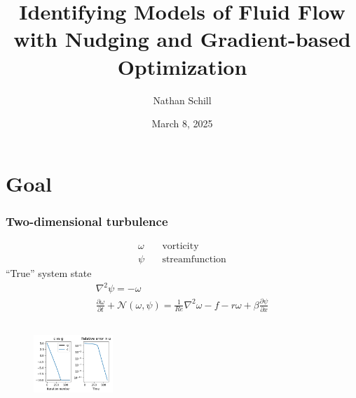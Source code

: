 \documentclass{beamer}
\title{Identifying Models of Fluid Flow with Nudging and Gradient-based Optimization}
\author{Nathan Schill}
\institute{Brigham Young University}
\date{March 8, 2025}
\begin{document}
\frame{\titlepage}

\section{Goal}

\begin{frame}
  \frametitle{Two-dimensional turbulence \cite{guan_online_2024}}

  \begin{align*}
    \omega & \quad \text{vorticity} \\
    \psi & \quad \text{streamfunction}
  \end{align*}
  ``True'' system state
  \begin{equation}
    \begin{gathered}
      \nabla^2 \psi = - \omega \\
      \frac{\partial \omega}{\partial t} + \mathcal N(\omega, \psi)
      = \frac1{Re} \nabla^2 \omega - f - r \omega
      + \beta \frac{\partial \psi}{\partial x}
    \end{gathered}
  \end{equation}

  \begin{figure}
    \centering
    \includegraphics[width=3cm, height=3cm, keepaspectratio]{placeholder.png}
  \end{figure}
\end{frame}
\end{document}
